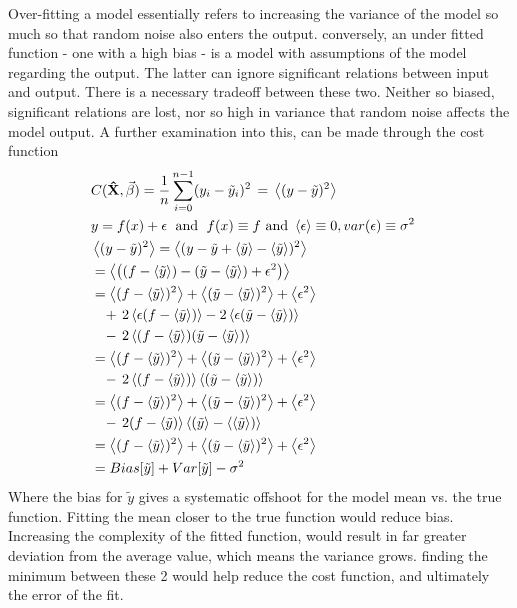 \documentclass[ 12pt, a4paper ]{article}
\begin{document}
Over-fitting a model essentially refers to increasing the variance of the model so much so
that random noise also enters the output. conversely, an under fitted function - one with a high
bias - is a model with assumptions of the model regarding the output. The latter can ignore
significant relations between input and output. There is a necessary tradeoff between these 
two. Neither so biased, significant relations are lost, nor so high in variance that random 
noise affects the model output. A further examination into this, can be made through the cost 
function
\begin{align}
    & C(\mathbf{\hat{X}}, \vec{\beta}) 
         = \frac{1}{n} \sum_{i=0}^{n-1}(y_i - \tilde{y}_i)^2
         \,=\, \ev{(y- \tilde{y})^2} &\\
    & y = f(x) + \epsilon \;\text{ and }\; f(x) \equiv f 
     \text{ and } \ev{\epsilon} \equiv 0, var(\epsilon)\equiv \sigma^2 &\nonumber \\
    & \ev{(y- \tilde{y})^2} = \ev{(y - \tilde{y} + \ev{\tilde{y}} - \ev{\tilde{y}})^2}
        & \nonumber \\
    & = \ev{ \qty( (f-\ev{\tilde{y}}) - (\tilde{y} - \ev{\tilde{y}}) + \epsilon^2 ) } 
        & \nonumber \\
    & = \ev{ (f-\ev{\tilde{y}})^2 }+ \ev{(\tilde{y} - \ev{\tilde{y}})^2} + \ev{\epsilon^2}
        & \nonumber\\
    &\;\;\;+\, 2\ev{\epsilon(f-\ev{\tilde{y}})} - 2\ev{\epsilon(\tilde{y} - \ev{\tilde{y}})}
         & \nonumber \\
    &\;\;\;-\, 2\ev{(f-\ev{\tilde{y}})(\tilde{y} - \ev{\tilde{y}}) } &\nonumber \\
    & = \ev{ (f-\ev{\tilde{y}})^2 }+ \ev{(\tilde{y} - \ev{\tilde{y}})^2} + \ev{\epsilon^2}
        & \nonumber\\
    &\;\;\;-\, 2\ev{(f-\ev{\tilde{y}})}\ev{(\tilde{y} - \ev{\tilde{y}})}
        & \nonumber\\
    & = \ev{ (f-\ev{\tilde{y}})^2 }+ \ev{(\tilde{y} - \ev{\tilde{y}})^2} + \ev{\epsilon^2}
        & \nonumber\\
    &\;\;\;-\, 2(f-\ev{\tilde{y})}\ev{(\tilde{y}} - \ev{\ev{\tilde{y}})}
        & \nonumber \\
    & = \ev{ (f-\ev{\tilde{y}})^2 }+ \ev{(\tilde{y} - \ev{\tilde{y}})^2} + \ev{\epsilon^2}
        & \nonumber\\
    & = Bias[\tilde{y}] + Var[\tilde{y}] - \sigma^2
\end{align}
Where the bias for $\tilde{y}$ gives a systematic offshoot for the model mean vs. the true 
function. Fitting the mean closer to the true function would reduce bias. Increasing the 
complexity of the fitted function, would result in far greater deviation from the average
value, which means the variance grows. finding the minimum between these 2 would help reduce
the cost function, and ultimately the error of the fit. 
\end{document}
